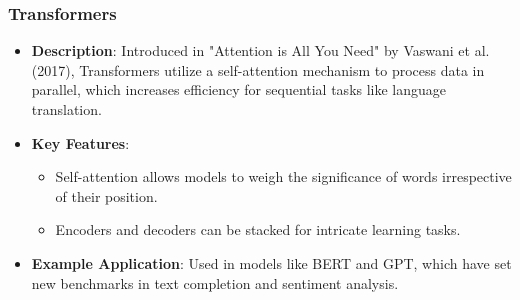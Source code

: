 \documentclass[aspectratio=169]{beamer}
\begin{document}
\begin{frame}[fragile]
    \frametitle{Transformers}
    
    \begin{itemize}
        \item \textbf{Description}: 
        Introduced in "Attention is All You Need" by Vaswani et al. (2017), Transformers utilize a self-attention mechanism to process data in parallel, which increases efficiency for sequential tasks like language translation.
        
        \item \textbf{Key Features}:
        \begin{itemize}
            \item Self-attention allows models to weigh the significance of words irrespective of their position.
            \item Encoders and decoders can be stacked for intricate learning tasks.
        \end{itemize}
        
        \item \textbf{Example Application}: 
        Used in models like BERT and GPT, which have set new benchmarks in text completion and sentiment analysis.
    \end{itemize}
\end{frame}
\end{document}
